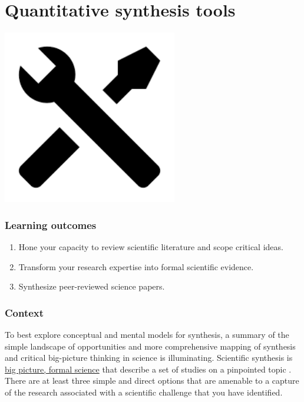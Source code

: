 \documentclass[
]{book}
\providecommand{\tightlist}{%
  \setlength{\itemsep}{0pt}\setlength{\parskip}{0pt}}
\begin{document}
\hypertarget{tools}{%
\chapter{Quantitative synthesis tools}\label{tools}}

\includegraphics[width=3in,height=\textheight]{./tools.png}

\hypertarget{learning-outcomes-1}{%
\subsection*{Learning outcomes}\label{learning-outcomes-1}}

\begin{enumerate}
\def\labelenumi{\arabic{enumi}.}
\tightlist
\item
  Hone your capacity to review scientific literature and scope critical ideas.
\item
  Transform your research expertise into formal scientific evidence.\\
\item
  Synthesize peer-reviewed science papers.
\end{enumerate}

\hypertarget{context}{%
\subsection*{Context}\label{context}}

To best explore conceptual and mental models for synthesis, a summary of the simple landscape of opportunities and more comprehensive mapping of synthesis and critical big-picture thinking in science is illuminating. Scientific synthesis is \href{https://onlinelibrary.wiley.com/doi/full/10.1111/j.1600-0706.2013.00970.x}{big picture, formal science} that describe a set of studies on a pinpointed topic \citep{RN3216}. There are at least three simple and direct options that are amenable to a capture of the research associated with a scientific challenge that you have identified.
\end{document}
